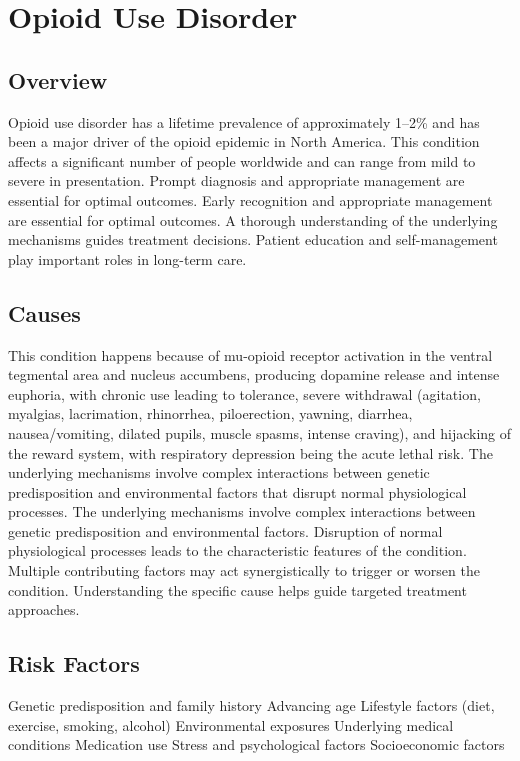 \chapter{Opioid Use Disorder}
\label{sec:Opioid Use Disorder}

\section{Overview}
Opioid use disorder has a lifetime prevalence of approximately 1--2\% and has been a major driver of the opioid epidemic in North America. This condition affects a significant number of people worldwide and can range from mild to severe in presentation. Prompt diagnosis and appropriate management are essential for optimal outcomes. Early recognition and appropriate management are essential for optimal outcomes. A thorough understanding of the underlying mechanisms guides treatment decisions. Patient education and self-management play important roles in long-term care.
\section{Causes}
This condition happens because of mu-opioid receptor activation in the ventral tegmental area and nucleus accumbens, producing dopamine release and intense euphoria, with chronic use leading to tolerance, severe withdrawal (agitation, myalgias, lacrimation, rhinorrhea, piloerection, yawning, diarrhea, nausea/vomiting, dilated pupils, muscle spasms, intense craving), and hijacking of the reward system, with respiratory depression being the acute lethal risk. The underlying mechanisms involve complex interactions between genetic predisposition and environmental factors that disrupt normal physiological processes. The underlying mechanisms involve complex interactions between genetic predisposition and environmental factors. Disruption of normal physiological processes leads to the characteristic features of the condition. Multiple contributing factors may act synergistically to trigger or worsen the condition. Understanding the specific cause helps guide targeted treatment approaches.
\section{Risk Factors}
Genetic predisposition and family history Advancing age Lifestyle factors (diet, exercise, smoking, alcohol) Environmental exposures Underlying medical conditions Medication use Stress and psychological factors Socioeconomic factors

